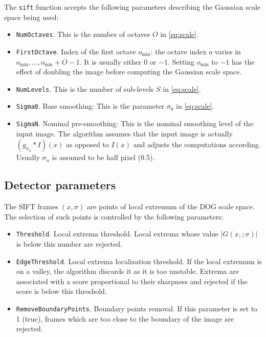 \documentclass{article}
\let\oldtt=\tt
\renewcommand{\tt}{\oldtt\color{codecolor}}
\begin{document}
The {\tt sift} function accepts the following parameters describing the Gaussian scale space being used:
\begin{itemize}
\item {\tt NumOctaves}. This is the number of octaves $O$ in \eqref{eq:scale}.
\item {\tt FirstOctave}. Index of the first octave $o_{\min}$: the octave index $o$ varies in  $o_{\min},...,o_{\min}+O-1$. It is usually either $0$ or $-1$. Setting $o_{\min}$ to $-1$ has the effect of doubling the image before computing the Gaussian scale space.
\item {\tt NumLevels}. This is the number of sub-levels $S$ in \eqref{eq:scale}.
\item {\tt Sigma0}. Base smoothing: This is the parameter $\sigma_0$ in \eqref{eq:scale}.
\item {\tt SigmaN}. Nominal pre-smoothing: This is the nominal smoothing level of the input image. The algorithm assumes that the input image is actually $(g_{\sigma_n}*I)(x)$ as opposed to $I(x)$ and adjusts the computations according. Usually $\sigma_n$ is assumed to be half pixel (0.5).
\end{itemize}

\subsection{Detector parameters}\label{sift.user.detector}

The SIFT frames $(x,\sigma)$ are points of local extremum of the DOG scale space. The selection of such points is controlled by the following parameters:
\begin{itemize}
\item {\tt Threshold}. Local extrema threshold. Local extrema whose value $|G(x,;\sigma)|$ is below this number are rejected.
\item {\tt EdgeThreshold}. Local extrema localization threshold. If the local extremum is on a valley, the algorithm discards it as it is too unstable. Extrema are associated with a score proportional to their sharpness and rejected if the score is below this threshold.
\item {\tt RemoveBoundaryPoints}. Boundary points removal. If this parameter is set to 1 (true), frames which are too close to the boundary of the image are rejected.
\end{itemize}
\end{document}
